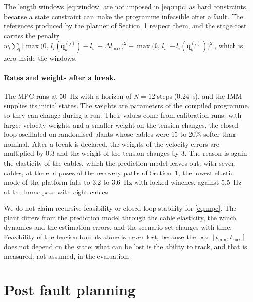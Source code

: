 \documentclass[10pt]{article}
\newcommand{\vc}[1]{\bm{#1}}
\begin{document}
The length windows \eqref{eq:window} are not imposed in \eqref{eq:mpc} as hard constraints, because a state constraint can make the programme infeasible after a fault. The references produced by the planner of Section~\ref{sec:planner} respect them, and the stage cost carries the penalty $w_l\sum_i\big[\max\!\big(0,\,l_i(\vc q^{(j)}_k)-l_i^--\Delta l_{\max}\big)^2+\max\!\big(0,\,l_i^--l_i(\vc q^{(j)}_k)\big)^2\big]$, which is zero inside the windows.

\paragraph{Rates and weights after a break.} The MPC runs at 50~Hz with a horizon of $N=12$ steps (0.24~s), and the IMM supplies its initial states. The weights are parameters of the compiled programme, so they can change during a run. Their values come from calibration runs: with larger velocity weights and a smaller weight on the tension changes, the closed loop oscillated on randomised plants whose cables were 15 to 20\% softer than nominal. After a break is declared, the weights of the velocity errors are multiplied by 0.3 and the weight of the tension changes by 3. The reason is again the elasticity of the cables, which the prediction model leaves out: with seven cables, at the end poses of the recovery paths of Section~\ref{sec:planner}, the lowest elastic mode of the platform falls to 3.2 to 3.6~Hz with locked winches, against 5.5~Hz at the home pose with eight cables.

We do not claim recursive feasibility or closed loop stability for \eqref{eq:mpc}. The plant differs from the prediction model through the cable elasticity, the winch dynamics and the estimation errors, and the scenario set changes with time. Feasibility of the tension bounds alone is never lost, because the box $[t_{\min},t_{\max}]$ does not depend on the state; what can be lost is the ability to track, and that is measured, not assumed, in the evaluation.

\section{Post fault planning}\label{sec:planner}
\end{document}
